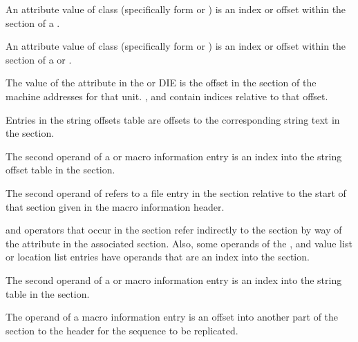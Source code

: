 \begin{description}
An attribute value of class \CLASSrnglist{} 
(specifically form \DWFORMrnglistx{} or \DWFORMsecoffset) 
is an index or offset within the \dotdebugrnglists{} 
section of a .

An attribute value of class \CLASSloclist{} 
(specifically form \DWFORMloclistx{} or \DWFORMsecoffset) 
is an index or offset within the \dotdebugloclists{}
section of a 
\bb
{} or
\eb
{}.

The value of the \DWATaddrbase{} attribute in the
\DWTAGcompileunit{} or \DWTAGpartialunit{} DIE is the
offset in the \dotdebugaddr{} section of the machine
addresses for that unit.
\DWFORMaddrxXN, \DWOPaddrx{} and \DWOPconstx{} contain
indices relative to that offset.

Entries in the string offsets table
are offsets to the corresponding string text in the 
\dotdebugstr{} section.

The second operand of a 
\DWMACROdefinestrx{} or \DWMACROundefstrx{} 
macro information entry is an index
into the string offset table in the 
\dotdebugstroffsets{} section.

The second operand of 
\DWMACROstartfile{} refers to a file entry in the 
\dotdebugline{} section relative to the start 
of that section given in the macro information header.

\DWOPaddrx{} and \DWOPconstx{} operators that occur in the 
\dotdebugloclists{} section refer indirectly to the 
\dotdebugaddr{} section by way of the 
\DWATaddrbase{} attribute in the associated \dotdebuginfo{} 
section.
\bb
Also, some operands of the \DWLLEbaseaddressx, \DWLLEstartxendx{} 
and \DWLLEstartxlength{} value list or 
location list entries have operands that 
are an index into the \dotdebugaddr{} section.
\eb

The second operand of a 
\DWMACROdefinestrp{} or \DWMACROundefstrp{} macro information
entry is an index into the string table in the 
\dotdebugstr{} section.

The operand of a 
\DWMACROimport{} macro information
entry is an offset into another part of the 
\dotdebugmacro{} section to the header for the 
sequence to be replicated.


\end{description}
